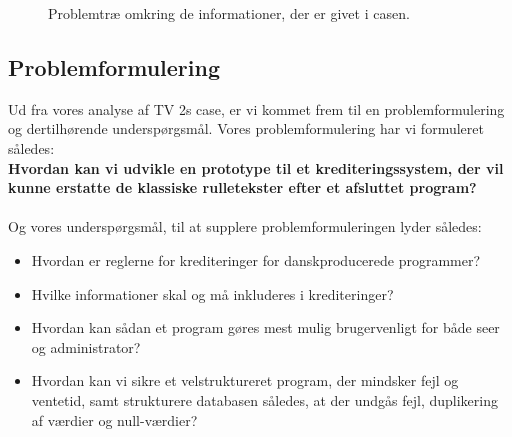  \begin{figure}[H]
    \centering
    \caption{Problemtræ omkring de informationer, der er givet i casen.}
    \label{fig:problemtræ}
\end{figure}

\subsection{Problemformulering}
Ud fra vores analyse af TV 2s case, er vi kommet frem til en problemformulering og dertilhørende underspørgsmål. Vores problemformulering har vi formuleret således:\\
\linebreak
\textbf{Hvordan kan vi udvikle en prototype til et krediteringssystem, der vil kunne erstatte de klassiske rulletekster efter et afsluttet program?}
\\\\
Og vores underspørgsmål, til at supplere problemformuleringen lyder således:
\begin{itemize}
    \item Hvordan er reglerne for krediteringer for danskproducerede programmer?
    \item Hvilke informationer skal og må inkluderes i krediteringer?
    \item Hvordan kan sådan et program gøres mest mulig brugervenligt for både seer og administrator?
    \item Hvordan kan vi sikre et velstruktureret program, der mindsker fejl og ventetid, samt strukturere databasen således, at der undgås fejl, duplikering af værdier og null-værdier?
\end{itemize}

